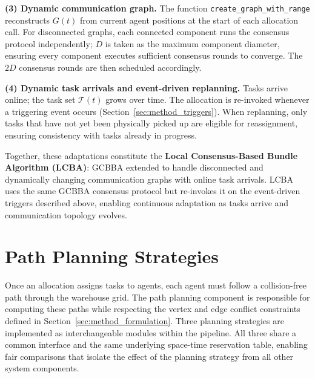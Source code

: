 \textbf{(3) Dynamic communication graph.}
The function \texttt{create\_graph\_with\_range} reconstructs $G(t)$ from
current agent positions at the start of each allocation call.
For disconnected graphs, each connected component runs the consensus protocol
independently; $D$ is taken as the maximum component diameter, ensuring every
component executes sufficient consensus rounds to converge.
The $2D$ consensus rounds are then scheduled accordingly.

\textbf{(4) Dynamic task arrivals and event-driven replanning.}
Tasks arrive online; the task set $\mathcal{T}(t)$ grows over time.
The allocation is re-invoked whenever a triggering event occurs
(Section~\ref{sec:method_triggers}).
When replanning, only tasks that have not yet been physically picked up are
eligible for reassignment, ensuring consistency with tasks already in progress.

Together, these adaptations constitute the \textbf{Local Consensus-Based Bundle
Algorithm (LCBA)}: GCBBA extended to handle disconnected and dynamically
changing communication graphs with online task arrivals.
LCBA uses the same GCBBA consensus protocol but re-invokes it on the
event-driven triggers described above, enabling continuous adaptation as tasks
arrive and communication topology evolves.


\section{Path Planning Strategies}
\label{sec:method_collision}

Once an allocation assigns tasks to agents, each agent must follow a
collision-free path through the warehouse grid.
The path planning component is responsible for computing these paths while
respecting the vertex and edge conflict constraints defined in
Section~\ref{sec:method_formulation}.
Three planning strategies are implemented as interchangeable modules within the
pipeline.
All three share a common interface and the same underlying space-time reservation
table, enabling fair comparisons that isolate the effect of the planning
strategy from all other system components.

